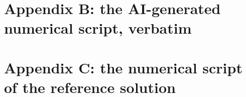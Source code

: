 \clearpage
\section*{Appendix B: the AI-generated numerical script, verbatim}



\clearpage
\section*{Appendix C: the numerical script of the reference solution}

